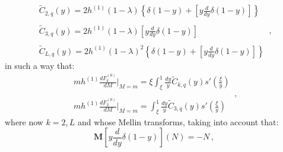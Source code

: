 \documentclass[10pt,a4paper]{article}
\begin{document}
\begin{equation}
\begin{array}{l}
\displaystyle \widetilde{C}_{2,q}(y)=2h^{(1)}(1-\lambda)\left\{\delta(1-y)+\left[y\frac{d}{dy}\delta(1-y)\right]\right\}\\
\\
\displaystyle \widetilde{C}_{3,q}(y)=2h^{(1)}(1-\lambda)\left[y\frac{d}{dy}\delta(1-y)\right]\\
\\
\displaystyle \widetilde{C}_{L,q}(y)=2h^{(1)}(1-\lambda)^2\left\{\delta(1-y)+\left[y\frac{d}{dy}\delta(1-y)\right]\right\}
\end{array}\,,
\label{RoughCF}
\end{equation}
in such a way that:
\begin{equation}
\begin{array}{l}
\displaystyle mh^{(1)}\frac{dF^{(0)}_k}{dM}\bigg|_{M=m} = \xi \int_\xi^1\frac{dy}{y}\widetilde{C}_{k,q}(y)s'\left(\frac{\xi}{y}\right)\\
\\
\displaystyle mh^{(1)}\frac{dF^{(0)}_3}{dM}\bigg|_{M=m} = \int_\xi^1\frac{dy}{y}\widetilde{C}_{3,q}(y)s'\left(\frac{\xi}{y}\right)
\end{array}\,,
\end{equation}
where now $k=2,L$ and whose Mellin transforms, taking into account that:
\begin{equation}
\mathbf{M}\left[y\frac{d}{dy}\delta(1-y)\right](N) = - N\,,
\end{equation}
\end{document}
